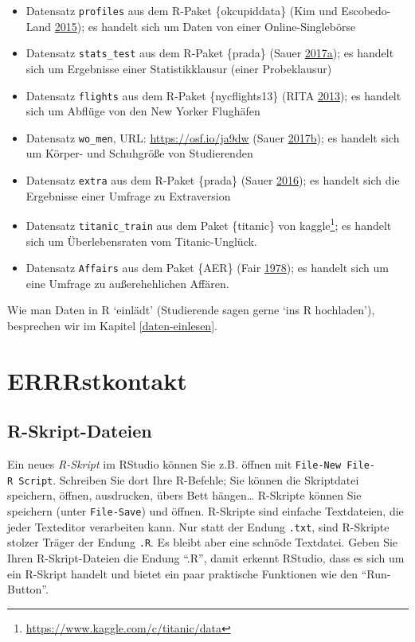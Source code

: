 \documentclass[12pt,ngerman,]{book}
\providecommand{\tightlist}{%
  \setlength{\itemsep}{0pt}\setlength{\parskip}{0pt}}
\let\rmarkdownfootnote\footnote%
\def\footnote{\protect\rmarkdownfootnote}
\renewcommand{\href}[2]{#2\footnote{\url{#1}}}
\theoremstyle{definition}
\theoremstyle{definition}
\theoremstyle{remark}
\begin{document}
\begin{itemize}
\tightlist
\item
  Datensatz \texttt{profiles} aus dem R-Paket \{okcupiddata\} (Kim und
  Escobedo-Land \protect\hyperlink{ref-kim2015okcupid}{2015}); es
  handelt sich um Daten von einer Online-Singlebörse
\item
  Datensatz \texttt{stats\_test} aus dem R-Paket \{prada\} (Sauer
  \protect\hyperlink{ref-Sauer_2017}{2017}\protect\hyperlink{ref-Sauer_2017}{a});
  es handelt sich um Ergebnisse einer Statistikklausur (einer
  Probeklausur)
\item
  Datensatz \texttt{flights} aus dem R-Paket \{nycflights13\} (RITA
  \protect\hyperlink{ref-nycflights13}{2013}); es handelt sich um
  Abflüge von den New Yorker Flughäfen
\item
  Datensatz \texttt{wo\_men}, URL: \url{https://osf.io/ja9dw} (Sauer
  \protect\hyperlink{ref-Sauer_2017a}{2017}\protect\hyperlink{ref-Sauer_2017a}{b});
  es handelt sich um Körper- und Schuhgröße von Studierenden
\item
  Datensatz \texttt{extra} aus dem R-Paket \{prada\} (Sauer
  \protect\hyperlink{ref-Sauer_2016}{2016}); es handelt sich die
  Ergebnisse einer Umfrage zu Extraversion
\item
  Datensatz \texttt{titanic\_train} aus dem Paket \{titanic\} von
  \href{https://www.kaggle.com/c/titanic/data}{kaggle}; es handelt sich
  um Überlebensraten vom Titanic-Unglück.
\item
  Datensatz \texttt{Affairs} aus dem Paket \{AER\} (Fair
  \protect\hyperlink{ref-fair1978theory}{1978}); es handelt sich um eine
  Umfrage zu außerehehlichen Affären.
\end{itemize}

Wie man Daten in R `einlädt' (Studierende sagen gerne `ins R
hochladen'), besprechen wir im Kapitel \ref{daten-einlesen}.

\section{ERRRstkontakt}\label{errrstkontakt}

\subsection{R-Skript-Dateien}\label{r-skript-dateien}

Ein neues \emph{R-Skript} im RStudio können Sie z.B.
öffnen mit \texttt{File-New\ File-R\ Script}. Schreiben Sie dort Ihre
R-Befehle; Sie können die Skriptdatei speichern, öffnen, ausdrucken,
übers Bett hängen\ldots{} R-Skripte können Sie speichern (unter
\texttt{File-Save}) und öffnen. R-Skripte sind einfache Textdateien, die
jeder Texteditor verarbeiten kann. Nur statt der Endung \texttt{.txt},
sind R-Skripte stolzer Träger der Endung \texttt{.R}. Es bleibt aber
eine schnöde Textdatei. Geben Sie Ihren R-Skript-Dateien die Endung
``.R'', damit erkennt RStudio, dass es sich um ein R-Skript handelt und
bietet ein paar praktische Funktionen wie den ``Run-Button''.
\end{document}

